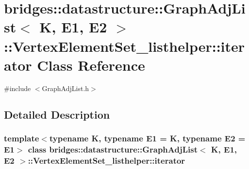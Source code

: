 \hypertarget{classbridges_1_1datastructure_1_1_graph_adj_list_1_1_vertex_element_set__listhelper_1_1iterator}{}\section{bridges\+::datastructure\+::Graph\+Adj\+List$<$ K, E1, E2 $>$\+::Vertex\+Element\+Set\+\_\+listhelper\+::iterator Class Reference}
\label{classbridges_1_1datastructure_1_1_graph_adj_list_1_1_vertex_element_set__listhelper_1_1iterator}


{\ttfamily \#include $<$Graph\+Adj\+List.\+h$>$}



\subsection{Detailed Description}
\subsubsection*{template$<$typename K, typename E1 = K, typename E2 = E1$>$\newline
class bridges\+::datastructure\+::\+Graph\+Adj\+List$<$ K, E1, E2 $>$\+::\+Vertex\+Element\+Set\+\_\+listhelper\+::iterator}


